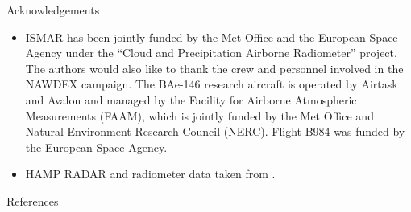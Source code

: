\documentclass[8pt, final,hyperref={pdfpagelabels=false}]{beamer}
\begin{document}
\begin{frame}
\begin{columns}[t]
\begin{column}{.48\linewidth}
      \begin{block}{Acknowledgements}
        \begin{scriptsize}
          \begin{itemize}
          \item ISMAR has been jointly funded by the Met Office and the European Space Agency under the “Cloud and Precipitation Airborne Radiometer” project. The authors would also like to thank the crew and personnel involved in the NAWDEX campaign. The BAe-146 research aircraft is operated by Airtask and Avalon and managed by the Facility for Airborne Atmospheric Measurements (FAAM), which is jointly funded by the Met Office and Natural Environment Research Council (NERC). Flight B984 was funded by the European Space Agency.
            \item HAMP RADAR and radiometer data taken from \cite{halo}.
            \end{itemize}
          \end{scriptsize}
      \end{block}
      \vspace{-1cm}
      \begin{block}{References}
        
        
      \end{block}

    \end{column}
   \end{columns}
  \end{frame}
\end{document}
